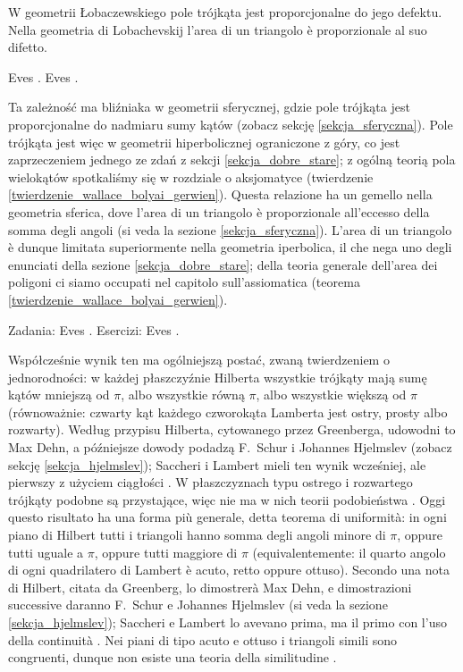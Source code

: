 \begin{theorem}
	W geometrii Łobaczewskiego pole trójkąta jest proporcjonalne do jego defektu. %
	Nella geometria di Lobachevskij l'area di un triangolo è proporzionale al suo difetto. %
\end{theorem}

Eves \cite[s. 304]{eves1_1972}. %
Eves \cite[p. 304]{eves1_1972}. %

Ta zależność ma bliźniaka w geometrii sferycznej, gdzie pole trójkąta jest proporcjonalne do nadmiaru sumy kątów (zobacz sekcję \ref{sekcja_sferyczna}). %
Pole trójkąta jest więc w geometrii hiperbolicznej ograniczone z góry, co jest zaprzeczeniem jednego ze zdań z sekcji \ref{sekcja_dobre_stare}; z ogólną teorią pola wielokątów spotkaliśmy się w rozdziale o aksjomatyce (twierdzenie \ref{twierdzenie_wallace_bolyai_gerwien}). %
Questa relazione ha un gemello nella geometria sferica, dove l'area di un triangolo è proporzionale all'eccesso della somma degli angoli (si veda la sezione \ref{sekcja_sferyczna}). %
L'area di un triangolo è dunque limitata superiormente nella geometria iperbolica, il che nega uno degli enunciati della sezione \ref{sekcja_dobre_stare}; della teoria generale dell'area dei poligoni ci siamo occupati nel capitolo sull'assiomatica (teorema \ref{twierdzenie_wallace_bolyai_gerwien}). %

Zadania: Eves \cite[s. 301, 304]{eves1_1972}. %
Esercizi: Eves \cite[p. 301, 304]{eves1_1972}. %

Współcześnie wynik ten ma ogólniejszą postać, zwaną twierdzeniem o jednorodności: w każdej płaszczyźnie Hilberta wszystkie trójkąty mają sumę kątów mniejszą od $\pi$, albo wszystkie równą $\pi$, albo wszystkie większą od $\pi$ (równoważnie: czwarty kąt każdego czworokąta Lamberta jest ostry, prosty albo rozwarty). %
Według przypisu Hilberta, cytowanego przez Greenberga, udowodni to Max Dehn, a późniejsze dowody podadzą F.~Schur i Johannes Hjelmslev (zobacz sekcję \ref{sekcja_hjelmslev}); Saccheri i Lambert mieli ten wynik wcześniej, ale pierwszy z użyciem ciągłości \cite[s. 208]{greenberg_2010}. %
W płaszczyznach typu ostrego i rozwartego trójkąty podobne są przystające, więc nie ma w nich teorii podobieństwa \cite[s. 208]{greenberg_2010}. %
Oggi questo risultato ha una forma più generale, detta teorema di uniformità: in ogni piano di Hilbert tutti i triangoli hanno somma degli angoli minore di $\pi$, oppure tutti uguale a $\pi$, oppure tutti maggiore di $\pi$ (equivalentemente: il quarto angolo di ogni quadrilatero di Lambert è acuto, retto oppure ottuso). %
Secondo una nota di Hilbert, citata da Greenberg, lo dimostrerà Max Dehn, e dimostrazioni successive daranno F.~Schur e Johannes Hjelmslev (si veda la sezione \ref{sekcja_hjelmslev}); Saccheri e Lambert lo avevano prima, ma il primo con l'uso della continuità \cite[p. 208]{greenberg_2010}. %
Nei piani di tipo acuto e ottuso i triangoli simili sono congruenti, dunque non esiste una teoria della similitudine \cite[p. 208]{greenberg_2010}. %
